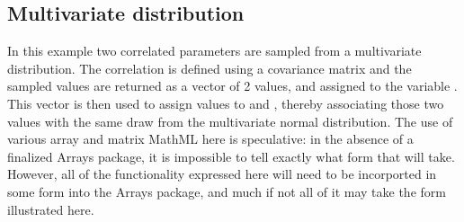 \documentclass[draftspec]{sbmlpkgspec}
\newcommand{\Distribution}{\defRef{Distribution}{distributionOrSample-class}}
\newcommand{\mathml}{MathML\xspace}
\newcommand{\uncertml}{UncertML\xspace}
\begin{document}


\subsection{Multivariate distribution}

In this example two correlated parameters are sampled from a
multivariate distribution. The correlation is defined using a
covariance matrix and the sampled values are returned as a vector of 2
values, and assigned to the variable .  This vector is then used to assign values to  and , thereby associating those two values with the same draw from the multivariate normal distribution.  The use of various array and matrix \mathml here is speculative:  in the absence of a finalized Arrays package, it is impossible to tell exactly what form that will take.  However, all of the functionality expressed here will need to be incorported in some form into the Arrays package, and much if not all of it may take the form illustrated here.









\end{document}
